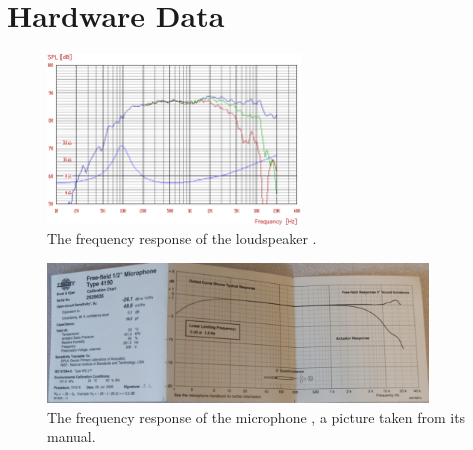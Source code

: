 \chapter{Hardware Data}
\label{app:hardware-data}

\begin{figure}[h]
	    \caption[Frequency response loudspeaker]{The frequency response of the loudspeaker \cite{manual:loudspeaker}.}
	    \label{fig:app:hardware:loudspeaker}
        \centering
		\includegraphics[width=0.6\textwidth]{afbeeldingen/app-loudspeaker.png}
\end{figure}

\begin{figure}[h]
	    \caption[Frequency response microphone]{The frequency response of the microphone \cite{manual:microphone}, a picture taken from its manual.}
	    \label{fig:app:hardware:mic}
        \centering
		\includegraphics[width=0.9\textwidth]{afbeeldingen/app-mic.png}
\end{figure}

